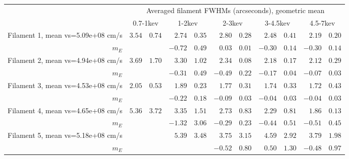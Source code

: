 \begin{tabular}{@{}rr@{ $\pm$ }lr@{ $\pm$ }lr@{ $\pm$ }lr@{ $\pm$ }lr@{ $\pm$ }l@{}}
\toprule
{} & \multicolumn{10}{c}{Averaged filament FWHMs (arcseconds), geometric mean} \\
\cmidrule(l){2-11}
 & \multicolumn{2}{c}{0.7-1kev} & \multicolumn{2}{c}{1-2kev} & \multicolumn{2}{c}{2-3kev} & \multicolumn{2}{c}{3-4.5kev} & \multicolumn{2}{c}{4.5-7kev}\\
\midrule
Filament 1, mean vs=5.09e+08 cm/s & $3.54$ & $0.74$ & $2.74$ & $0.35$ & $2.80$ & $0.28$ & $2.48$ & $0.41$ & $2.19$ & $0.20$\\
$m_E$ & {} & {} & $-0.72$ & $0.49$ & $0.03$ & $0.01$ & $-0.30$ & $0.14$ & $-0.30$ & $0.14$\\
Filament 2, mean vs=4.94e+08 cm/s & $3.69$ & $1.70$ & $3.30$ & $1.02$ & $2.34$ & $0.08$ & $2.18$ & $0.17$ & $2.12$ & $0.29$\\
$m_E$ & {} & {} & $-0.31$ & $0.49$ & $-0.49$ & $0.22$ & $-0.17$ & $0.04$ & $-0.07$ & $0.03$\\
Filament 3, mean vs=4.53e+08 cm/s & $2.05$ & $0.53$ & $1.89$ & $0.23$ & $1.77$ & $0.31$ & $1.74$ & $0.33$ & $1.72$ & $0.43$\\
$m_E$ & {} & {} & $-0.22$ & $0.18$ & $-0.09$ & $0.03$ & $-0.04$ & $0.03$ & $-0.04$ & $0.03$\\
Filament 4, mean vs=4.65e+08 cm/s & $5.36$ & $3.72$ & $3.35$ & $1.51$ & $2.73$ & $0.83$ & $2.29$ & $0.81$ & $1.86$ & $0.13$\\
$m_E$ & {} & {} & $-1.32$ & $3.06$ & $-0.29$ & $0.23$ & $-0.44$ & $0.51$ & $-0.51$ & $0.45$\\
Filament 5, mean vs=5.18e+08 cm/s & {} & {} & $5.39$ & $3.48$ & $3.75$ & $3.15$ & $4.59$ & $2.92$ & $3.79$ & $1.98$\\
$m_E$ & {} & {} & {} & {} & $-0.52$ & $0.80$ & $0.50$ & $1.30$ & $-0.48$ & $0.97$\\
\bottomrule
\end{tabular}

